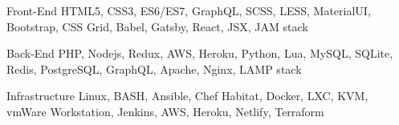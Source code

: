 

\begin{cvskills}

  \cvskill
    {Front-End} %
    {HTML5, CSS3, ES6/ES7, GraphQL, SCSS, LESS, MaterialUI, Bootstrap, CSS Grid, Babel, Gatsby, React, JSX, JAM stack} %

  \cvskill
    {Back-End} %
    {PHP, Nodejs, Redux, AWS, Heroku, Python, Lua, MySQL, SQLite, Redis, PostgreSQL, GraphQL, Apache, Nginx, LAMP stack} %

  \cvskill
    {Infrastructure} %
    {Linux, BASH, Ansible, Chef Habitat, Docker, LXC, KVM, vmWare Workstation, Jenkins, AWS, Heroku, Netlify, Terraform } %
    

\end{cvskills}